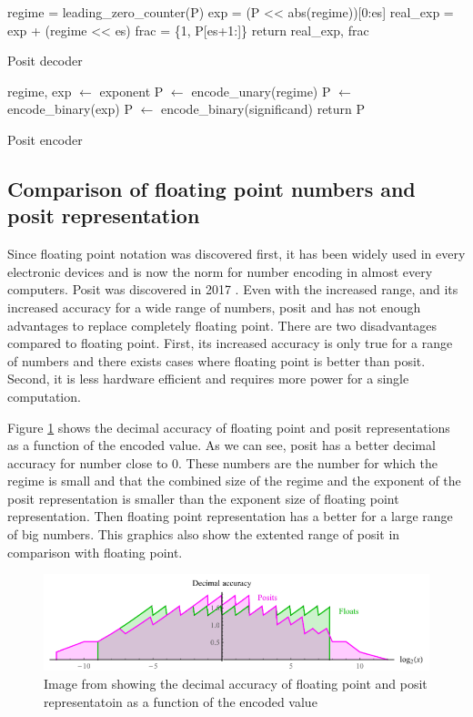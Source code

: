 \begin{algorithm}[!ht]
\SetAlgoLined
{}
regime = leading\_zero\_counter(P)\;
exp = (P << abs(regime))[0:es]\;
real\_exp = exp + (regime << es)\;
frac = \{1, P[es+1:]\}\;
return real\_exp, frac\;
\caption{Posit decoder}
\label{alg:posit_dec}
\end{algorithm}

\begin{algorithm}[!ht]
\SetAlgoLined
{}
regime, exp $\leftarrow$ exponent\;
P $\leftarrow$ encode\_unary(regime)\;
P $\leftarrow$ encode\_binary(exp)\;
P $\leftarrow$ encode\_binary(significand)\;
return P\;
\caption{Posit encoder}
\label{alg:posit_enc}
\end{algorithm}

\subsection{Comparison of floating point numbers and posit representation}

Since floating point notation was discovered first, it has been widely used in every electronic devices and is now the norm for number encoding in almost every computers. Posit was discovered in 2017 \cite{posit_std}. Even with the increased range, and its increased accuracy for a wide range of numbers, posit and has not enough advantages to replace completely floating point. There are two disadvantages compared to floating point. First, its increased accuracy is only true for a range of numbers and there exists cases where floating point is better than posit. Second, it is less hardware efficient and requires more power for a single computation.

Figure \ref{fig:deci_accur} shows the decimal accuracy of floating point and posit representations as a function of the encoded value. As we can see, posit has a better decimal accuracy for number close to 0. These numbers are the number for which the regime is small and that the combined size of the regime and the exponent of the posit representation is smaller than the exponent size of floating point representation. Then floating point representation has a better for a large range of big numbers. This graphics also show the extented range of posit in comparison with floating point.

\begin{figure}[!ht]
	\centering
	\includegraphics[width=0.9\linewidth]{../Images/decimal_accuracy.png}
	\caption{Image from \cite{posit_arithmetic} showing the decimal accuracy of floating point and posit representatoin as a function of the encoded value}
	\label{fig:deci_accur}
\end{figure}

